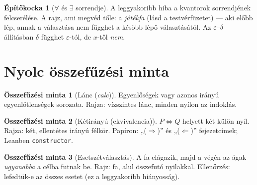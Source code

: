 \documentclass[11pt,a4paper]{article}
\newcommand{\lean}[1]{\texttt{\small #1}}
\newcommand{\eps}{\varepsilon}
\theoremstyle{definition}
\newtheorem{kocka}{Építőkocka}
\newtheorem{minta}{Összefűzési minta}
\begin{document}
\begin{kocka}[$\forall$ és $\exists$ sorrendje]
A leggyakoribb hiba a kvantorok sorrendjének felcserélése. A rajz, ami megvéd tőle:
a \emph{játékfa} (lásd a testvérfüzetet) --- aki előbb lép, annak a választása nem
függhet a később lépő választásától. Az $\eps$--$\delta$ állításban $\delta$ függhet
$\eps$-tól, de $x$-től \emph{nem}.
\end{kocka}

\section{Nyolc összefűzési minta}

\begin{minta}[Lánc (\emph{calc})]
Egyenlőségek vagy azonos irányú egyenlőtlenségek sorozata. Rajza: vízszintes lánc,
minden nyílon az indoklás.
\end{minta}

\begin{center}
\end{center}

\begin{minta}[Kétirányú (ekvivalencia)]
$P \iff Q$ helyett két külön nyíl. Rajza: két, ellentétes irányú félkör. Papíron:
„($\Rightarrow$)” és „($\Leftarrow$)” fejezetcímek; Leanben \lean{constructor}.
\end{minta}

\begin{minta}[Esetszétválasztás]
A fa elágazik, majd a végén az ágak \emph{ugyanabba} a célba futnak be. Rajz: fa,
alul összefutó nyilakkal. Ellenőrzés: lefedtük-e az összes esetet (ez a leggyakoribb hiányosság).
\end{minta}

\begin{center}
\end{center}
\end{document}
